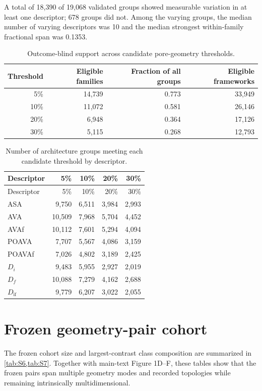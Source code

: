 \documentclass[11pt,a4paper]{article}
\begin{document}
A total of 18,390 of 19,068 validated groups showed measurable variation in at
least one descriptor; 678 groups did not. Among the varying groups, the median
number of varying descriptors was 10 and the median strongest within-family
fractional span was 0.1353.

\begin{table}[H]
\centering
\caption{Outcome-blind support across candidate pore-geometry thresholds.}
\label{tab:S4}
\begin{tabular}{rrrr}
\toprule
Threshold & Eligible families & Fraction of all groups & Eligible frameworks \\
\midrule
5\% & 14,739 & 0.773 & 33,949 \\
10\% & 11,072 & 0.581 & 26,146 \\
20\% & 6,948 & 0.364 & 17,126 \\
30\% & 5,115 & 0.268 & 12,793 \\
\bottomrule
\end{tabular}
\end{table}

\begin{longtable}{lrrrr}
\caption{Number of architecture groups meeting each candidate threshold by
descriptor.}\label{tab:S5}\\
\toprule
Descriptor & 5\% & 10\% & 20\% & 30\% \\
\midrule
\endfirsthead
\toprule
Descriptor & 5\% & 10\% & 20\% & 30\% \\
\midrule
\endhead
ASA & 9,750 & 6,511 & 3,984 & 2,993 \\
AVA & 10,509 & 7,968 & 5,704 & 4,452 \\
AVAf & 10,112 & 7,601 & 5,294 & 4,094 \\
POAVA & 7,707 & 5,567 & 4,086 & 3,159 \\
POAVAf & 7,026 & 4,802 & 3,189 & 2,425 \\
$D_i$ & 9,483 & 5,955 & 2,927 & 2,019 \\
$D_f$ & 10,088 & 7,279 & 4,162 & 2,688 \\
$D_{\mathrm{if}}$ & 9,779 & 6,207 & 3,022 & 2,055 \\
\bottomrule
\end{longtable}

\section{Frozen geometry-pair cohort}
\label{sec:frozen-pairs}

The frozen cohort size and largest-contrast class composition are summarized in \cref{tab:S6,tab:S7}. Together with main-text Figure 1D--F, these tables show that the frozen pairs span multiple geometry modes and recorded topologies while remaining intrinsically multidimensional.
\end{document}
